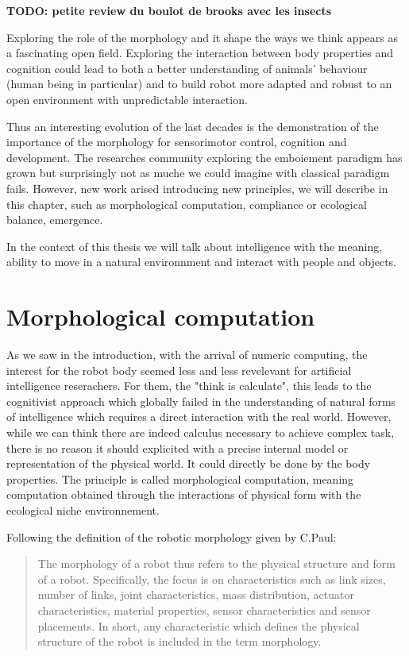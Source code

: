 \textbf{TODO: petite review du boulot de brooks avec les insects}

Exploring the role of the morphology and it shape the ways we think appears as a fascinating open field. Exploring the interaction between body properties and cognition could lead to both a better understanding of animals’ behaviour (human being in particular) and to build robot more adapted and robust to an open environment with unpredictable interaction.

Thus an interesting evolution of the last decades is the demonstration of the importance of the morphology for sensorimotor control, cognition and development. The researches community exploring the emboiement paradigm has grown but surprisingly not as muche we could imagine with classical paradigm fails. However, new work arised introducing new principles, we will describe in this chapter, such as morphological computation, compliance or ecological balance, emergence.

In the context of this thesis we will talk about intelligence with the meaning, ability to move in a natural environnment and interact with people and objects.

\section{Morphological computation} %

As we saw in the introduction, with the arrival of numeric computing, the interest for the robot body seemed less and less revelevant for artificial intelligence reserachers. For them, the "think is calculate", this leads to the cognitivist approach which globally failed in the understanding of natural forms of intelligence which requires a direct interaction with the real world.
However, while we can think there are indeed calculus necessary to achieve complex task, there is no reason it should explicited with a precise internal model or representation of the physical world. It could directly be done by the body properties. The principle is called morphological computation, meaning computation obtained through the interactions of physical form with the ecological niche environnement.

Following the definition of the robotic morphology given by C.Paul:
\begin{quotation}
The morphology of a robot thus refers to the physical structure and form of a robot. Specifically, the focus is on characteristics such as link sizes, number of links, joint characteristics, mass distribution, actuator characteristics, material properties, sensor characteristics and sensor placements. In short, any characteristic which defines the physical structure of the robot is included in the term morphology.
\end{quotation}

